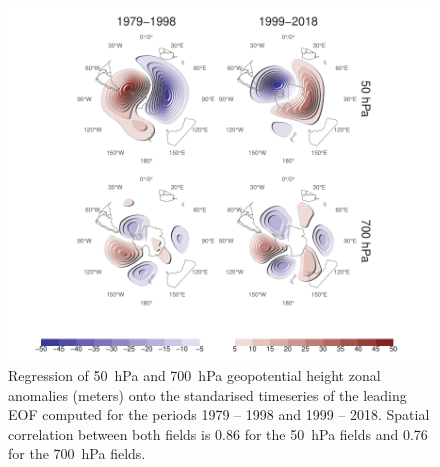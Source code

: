 \documentclass[smallextended]{svjour3}       %
\begin{document}
\begin{figure}
\includegraphics{A6-1} \caption{Regression of 50~hPa and 700~hPa geopotential height zonal anomalies (meters) onto the standarised timeseries of the leading EOF computed for the periods 1979 -- 1998 and 1999 -- 2018. Spatial correlation between both fields is 0.86 for the 50~hPa fields and 0.76 for the 700~hPa fields.}\label{fig:A6}
\end{figure}

\newpage



\end{document}
